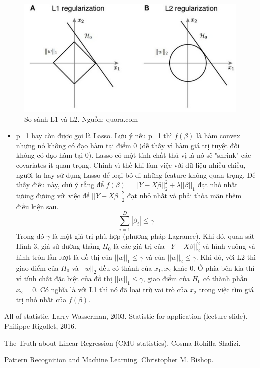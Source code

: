 \documentclass[10pt]{article}
\begin{document}
\begin{figure}
  \includegraphics[width=\linewidth]{lasso.png}
  \caption{So sánh L1 và L2. Nguồn: quora.com}
  \label{fig:boat1}
\end{figure}
\begin{itemize}

\item p=1 hay còn được gọi là Lasso. Lưu ý nếu p=1 thì $f(\beta)$ là hàm convex nhưng nó không có đạo hàm tại điểm 0 (dễ thấy vì hàm giá trị tuyệt đối không có đạo hàm tại 0). Lasso có một tính chất thú vị là nó sẽ "shrink" các covariates ít quan trọng. Chính vì thế khi làm việc với dữ liệu nhiều chiều, người ta hay sử dụng Lasso để loại bỏ đi những feature không quan trọng. Để thấy điều này, chú ý rằng để $f(\beta) = ||Y-X\beta||^2_2 + \lambda ||\beta||_1$ đạt nhỏ nhất tương đương với việc để $||Y-X\beta||^2_2$ đạt nhỏ nhất và phải thỏa mãn thêm điều kiện sau.
\[\sum_{i=1}^{D}|\beta_i| \leq \gamma\]
Trong đó $\gamma$ là một giá trị phù hợp (phương pháp Lagrance). Khi đó, quan sát Hình 3, giả sử đường thẳng $H_0$ là các giá trị của $||Y-X\beta||^2_2$ và hình vuông và hình tròn lần lượt là đồ thị của $||w||_1 \leq \gamma$ và của $||w||_2 \leq \gamma$. Khi đó, với L2 thì giao điểm của $H_0$ và $||w||_2$ đều có thành của $x_1, x_2$ khác 0. Ở phía bên kia thì vì tính chất đặc biệt của đồ thị  $||w||_1 \leq \gamma$, giao điểm của $H_0$ có thành phần $x_2=0$. Có nghĩa là với L1 thì nó đã loại trừ vai trò của $x_2$ trong việc tìm giá trị nhỏ nhất của $f(\beta)$.




\end{itemize}


\begin{thebibliography}{9}
All of statistic. 
\textit{}
Larry Wasserman, 2003.
Statistic for application (lecture slide). 
\textit{}
Philippe Rigollet, 2016.

The Truth about Linear Regression (CMU statistics). 
\textit{}
Cosma Rohilla Shalizi.

Pattern Recognition and Machine Learning. 
\textit{}
Christopher M. Bishop.

\end{thebibliography}
\end{document}
